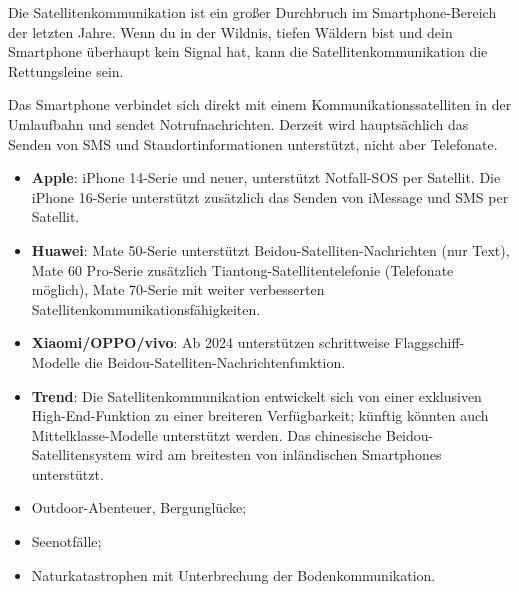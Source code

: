 


Die Satellitenkommunikation ist ein großer Durchbruch im Smartphone-Bereich der letzten Jahre. Wenn du in der Wildnis, tiefen Wäldern bist und dein Smartphone überhaupt kein Signal hat, kann die Satellitenkommunikation die Rettungsleine sein.


Das Smartphone verbindet sich direkt mit einem Kommunikationssatelliten in der Umlaufbahn und sendet Notrufnachrichten. Derzeit wird hauptsächlich das Senden von SMS und Standortinformationen unterstützt, nicht aber Telefonate.


\begin{itemize}
  \item \textbf{Apple}: iPhone 14-Serie und neuer, unterstützt Notfall-SOS per Satellit. Die iPhone 16-Serie unterstützt zusätzlich das Senden von iMessage und SMS per Satellit.
  \item \textbf{Huawei}: Mate 50-Serie unterstützt Beidou-Satelliten-Nachrichten (nur Text), Mate 60 Pro-Serie zusätzlich Tiantong-Satellitentelefonie (Telefonate möglich), Mate 70-Serie mit weiter verbesserten Satellitenkommunikationsfähigkeiten.
  \item \textbf{Xiaomi/OPPO/vivo}: Ab 2024 unterstützen schrittweise Flaggschiff-Modelle die Beidou-Satelliten-Nachrichtenfunktion.
  \item \textbf{Trend}: Die Satellitenkommunikation entwickelt sich von einer exklusiven High-End-Funktion zu einer breiteren Verfügbarkeit; künftig könnten auch Mittelklasse-Modelle unterstützt werden. Das chinesische Beidou-Satellitensystem wird am breitesten von inländischen Smartphones unterstützt.
\end{itemize}


\begin{itemize}
  \item Outdoor-Abenteuer, Bergunglücke;
  \item Seenotfälle;
  \item Naturkatastrophen mit Unterbrechung der Bodenkommunikation.
\end{itemize}

